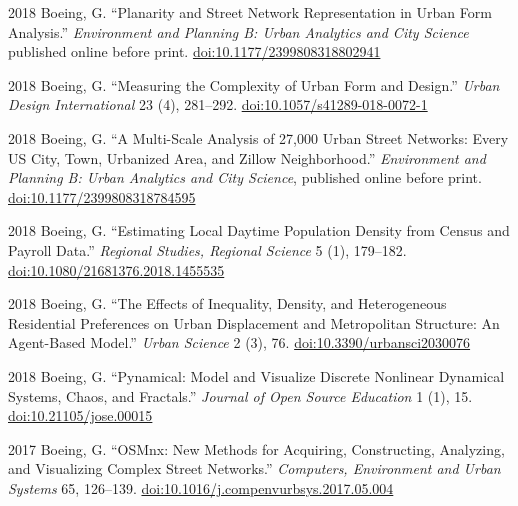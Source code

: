 \documentclass[12pt,letterpaper]{report}
\begin{document}
	\begin{tablist}
		
		\item[2018] \tab Boeing, G. \enquote{Planarity and Street Network Representation in Urban Form Analysis.} \textit{Environment and Planning B: Urban Analytics and City Science} published online before print. \href{https://doi.org/10.1177/2399808318802941}{doi:10.1177/2399808318802941}
		
		\item[2018] \tab Boeing, G. \enquote{Measuring the Complexity of Urban Form and Design.} \textit{Urban Design International} 23 (4), 281--292. \href{https://doi.org/10.1057/s41289-018-0072-1}{doi:10.1057/s41289-018-0072-1}
		
		\item[2018] \tab Boeing, G. \enquote{A Multi-Scale Analysis of 27,000 Urban Street Networks: Every US City, Town, Urbanized Area, and Zillow Neighborhood.} \textit{Environment and Planning B: Urban Analytics and City Science}, published online before print. \href{https://doi.org/10.1177/2399808318784595}{doi:10.1177/2399808318784595}
		
		\item[2018] \tab Boeing, G. \enquote{Estimating Local Daytime Population Density from Census and Payroll Data.} \textit{Regional Studies, Regional Science} 5 (1), 179--182. \href{https://doi.org/10.1080/21681376.2018.1455535}{doi:10.1080/21681376.2018.1455535}
		
		\item[2018] \tab Boeing, G. \enquote{The Effects of Inequality, Density, and Heterogeneous Residential Preferences on Urban Displacement and Metropolitan Structure: An Agent-Based Model.} \textit{Urban Science} 2 (3), 76. \href{https://doi.org/10.3390/urbansci2030076}{doi:10.3390/urbansci2030076}
		
		\item[2018] \tab Boeing, G. \enquote{Pynamical: Model and Visualize Discrete Nonlinear Dynamical Systems, Chaos, and Fractals.} \textit{Journal of Open Source Education} 1 (1), 15. \href{https://doi.org/10.21105/jose.00015}{doi:10.21105/jose.00015}
		
		\item[2017] \tab Boeing, G. \enquote{OSMnx: New Methods for Acquiring, Constructing, Analyzing, and Visualizing Complex Street Networks.} \textit{Computers, Environment and Urban Systems} 65, 126--139. \href{https://doi.org/10.1016/j.compenvurbsys.2017.05.004}{doi:10.1016/j.compenvurbsys.2017.05.004}
		

\end{tablist}
\end{document}
